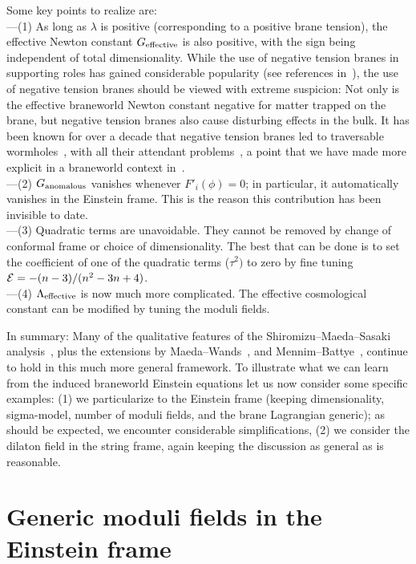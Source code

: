\documentclass[a4paper,10pt]{article}
\begin{document}
{Some key points to realize are: 
\\
---(1) As long as $\lambda$ is positive (corresponding to a positive
brane tension), the effective Newton constant $G_{\mathrm{effective}}$ is also
positive, with the sign being independent of total
dimensionality. While the use of negative tension branes in supporting
roles has gained considerable popularity (see references
in~\cite{void}), the use of negative tension branes should be viewed
with extreme suspicion: Not only is the effective braneworld Newton
constant negative for matter trapped on the brane, but negative
tension branes also cause disturbing effects in the bulk. It has been
known for over a decade that negative tension branes led to
traversable wormholes~\cite{surgery}, with all their attendant
problems~\cite{book}, a point that we have made more explicit in a
braneworld context in~\cite{void}.
\\
---(2) $G_{\mathrm{anomalous}}$ vanishes whenever $F'_i(\phi)=0$; in particular,
it automatically vanishes in the Einstein frame. This is the reason
this contribution has been invisible to date.
\\
---(3) Quadratic terms are unavoidable. They cannot be removed by
change of conformal frame or choice of dimensionality. The best that
can be done is to set the coefficient of one of the quadratic terms
($\tau^2)$ to zero by fine tuning ${\mathcal E}=-(n-3)/(n^2-3n+4)$.
\\ 
---(4) $\Lambda_{\mathrm{effective}}$ is now much more complicated. The effective
cosmological constant can be modified by tuning the moduli fields.

In summary: Many of the qualitative features of the
Shiromizu--Maeda--Sasaki analysis~\cite{Shiromizu}, plus the
extensions by Maeda--Wands~\cite{Wands}, and
Mennim--Battye~\cite{Mennim}, continue to hold in this much more
general framework.  To illustrate what we can learn from the induced
braneworld Einstein equations let us now consider some specific
examples: (1) we particularize to the Einstein frame (keeping
dimensionality, sigma-model, number of moduli fields, and the brane
Lagrangian generic); as should be expected, we encounter considerable
simplifications, (2) we consider the dilaton field in the string
frame, again keeping the discussion as general as is reasonable.

\section{Generic moduli fields in the Einstein frame}
\setcounter{equation}{0}

}
\end{document}
